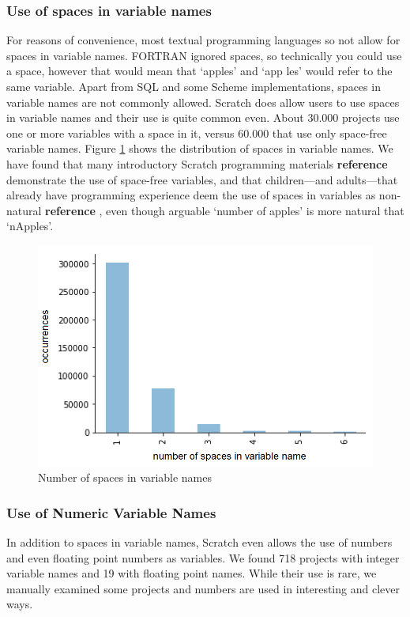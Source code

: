 \documentclass[conference]{IEEEtran}
\newcommand{\todo}[1]{ \textbf{#1} }
\begin{document}
\subsubsection{Use of spaces in variable names}
For reasons of convenience, most textual programming languages so not allow for spaces in variable names. FORTRAN ignored spaces, so technically you could use a space, however that would mean that `apples' and `app les' would refer to the same variable. Apart from SQL and some Scheme implementations, spaces in variable names are not commonly allowed. Scratch does allow users to use spaces in variable names and their use is quite common even. About 30.000 projects use one or more variables with a space in it, versus 60.000 that use only space-free variable names. Figure \ref{fig:number_of_spaces} shows the distribution of spaces in variable names. We have found that many introductory Scratch programming materials \todo{reference} demonstrate the use of space-free variables, and that children---and adults---that already have programming experience deem the use of spaces in variables as non-natural\todo{reference}, even though arguable `number of apples' is more natural that `nApples'.

\begin{figure}
	\begin{center}
		\includegraphics[width=\columnwidth]{fig/spaces_varname_occurrences}
		\caption{Number of spaces in variable names}
		\label{fig:number_of_spaces}
	\end{center}
\end{figure} 

\subsubsection{Use of Numeric Variable Names}
In addition to spaces in variable names, Scratch even allows the use of numbers and even floating point numbers as variables. We found 718 projects with integer variable names and 19 with floating point names. While their use is rare, we manually examined some projects and numbers are used in interesting and clever ways. 
\end{document}
